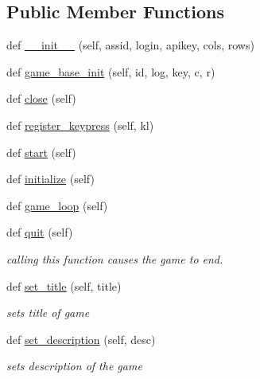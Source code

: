 \subsection*{Public Member Functions}
\begin{DoxyCompactItemize}
\item 
def \mbox{\hyperlink{classbridges_1_1gamebase_1_1_game_base_a869c20436a432429580f1a4e5fb63b9e}{\+\_\+\+\_\+init\+\_\+\+\_\+}} (self, assid, login, apikey, cols, rows)
\item 
def \mbox{\hyperlink{classbridges_1_1gamebase_1_1_game_base_ad0d97def82fd9c51fd7beed609663d50}{game\+\_\+base\+\_\+init}} (self, id, log, key, c, r)
\item 
def \mbox{\hyperlink{classbridges_1_1gamebase_1_1_game_base_aa30b096b3b2834d36a05acd982625517}{close}} (self)
\item 
def \mbox{\hyperlink{classbridges_1_1gamebase_1_1_game_base_ac60243e192a502fb7be51f86eb5b76b6}{register\+\_\+keypress}} (self, kl)
\item 
def \mbox{\hyperlink{classbridges_1_1gamebase_1_1_game_base_a05a30fccf88c2baba1137b5a06ba2ed7}{start}} (self)
\item 
def \mbox{\hyperlink{classbridges_1_1gamebase_1_1_game_base_a336629d190f1601f1211ca57e4d5427d}{initialize}} (self)
\item 
def \mbox{\hyperlink{classbridges_1_1gamebase_1_1_game_base_af650eeb756558d2cbcae43c74de5cce7}{game\+\_\+loop}} (self)
\item 
def \mbox{\hyperlink{classbridges_1_1gamebase_1_1_game_base_a21742d4e630fa64dc76848c7b4fcb344}{quit}} (self)
\begin{DoxyCompactList}\small\item\em calling this function causes the game to end. \end{DoxyCompactList}\item 
def \mbox{\hyperlink{classbridges_1_1gamebase_1_1_game_base_a7e7d4033c4b191b3699dbf0cb5f25933}{set\+\_\+title}} (self, title)
\begin{DoxyCompactList}\small\item\em sets title of game \end{DoxyCompactList}\item 
def \mbox{\hyperlink{classbridges_1_1gamebase_1_1_game_base_a75ecd56daf08036207772d6ce81c90b1}{set\+\_\+description}} (self, desc)
\begin{DoxyCompactList}\small\item\em sets description of the game \end{DoxyCompactList}\item 

\end{DoxyCompactItemize}
